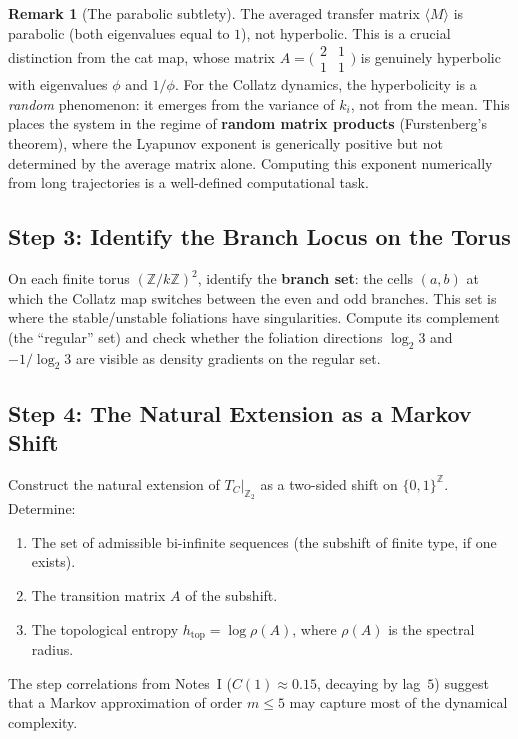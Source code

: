 \documentclass[11pt,a4paper]{article}
\newcommand{\Z}{\mathbb{Z}}
\theoremstyle{plain}
\theoremstyle{definition}
\newtheorem{remark}[theorem]{Remark}
\begin{document}
\begin{remark}[The parabolic subtlety]
    The averaged transfer matrix $\langle M \rangle$ is parabolic (both eigenvalues equal to $1$), not hyperbolic. This is a crucial distinction from the cat map, whose matrix $A = \bigl(\begin{smallmatrix} 2 & 1 \\ 1 & 1 \end{smallmatrix}\bigr)$ is genuinely hyperbolic with eigenvalues $\phi$ and $1/\phi$. For the Collatz dynamics, the hyperbolicity is a \emph{random} phenomenon: it emerges from the variance of $k_i$, not from the mean. This places the system in the regime of \textbf{random matrix products} (Furstenberg's theorem), where the Lyapunov exponent is generically positive but not determined by the average matrix alone. Computing this exponent numerically from long trajectories is a well-defined computational task.
\end{remark}


\subsection{Step 3: Identify the Branch Locus on the Torus}

\begin{nextstep}[Computational]
On each finite torus $(\Z/k\Z)^2$, identify the \textbf{branch set}: the cells $(a,b)$ at which the Collatz map switches between the even and odd branches. This set is where the stable/unstable foliations have singularities. Compute its complement (the ``regular'' set) and check whether the foliation directions $\log_2 3$ and $-1/\log_2 3$ are visible as density gradients on the regular set.
\end{nextstep}


\subsection{Step 4: The Natural Extension as a Markov Shift}

\begin{nextstep}[Analytical]
Construct the natural extension of $T_C|_{\Z_2}$ as a two-sided shift on $\{0,1\}^{\Z}$. Determine:
\begin{enumerate}[label=(\alph*)]
    \item The set of admissible bi-infinite sequences (the subshift of finite type, if one exists).
    \item The transition matrix $A$ of the subshift.
    \item The topological entropy $h_{\mathrm{top}} = \log \rho(A)$, where $\rho(A)$ is the spectral radius.
\end{enumerate}
The step correlations from Notes~I ($C(1) \approx 0.15$, decaying by lag~$5$) suggest that a Markov approximation of order $m \leq 5$ may capture most of the dynamical complexity.
\end{nextstep}
\end{document}
